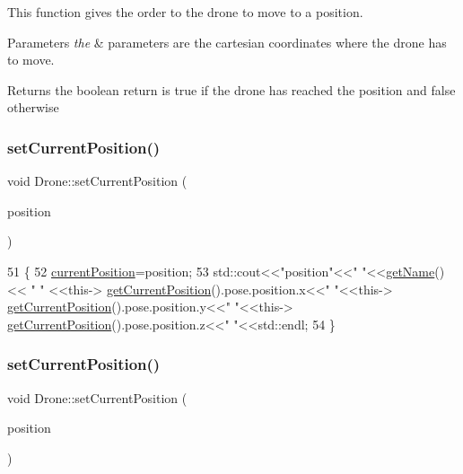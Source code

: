 This function gives the order to the drone to move to a position. 
\begin{DoxyParams}{Parameters}
{\em the} & parameters are the cartesian coordinates where the drone has to move. \\
\hline
\end{DoxyParams}
\begin{DoxyReturn}{Returns}
the boolean return is true if the drone has reached the position and false otherwise 
\end{DoxyReturn}
\mbox{\label{classDrone_a16ee9c16220886633f98e591c9e3dac5}} 
\subsubsection{\texorpdfstring{set\+Current\+Position()}{setCurrentPosition()}\hspace{0.1cm}{\footnotesize\ttfamily [1/2]}}
{\footnotesize\ttfamily void Drone\+::set\+Current\+Position (\begin{DoxyParamCaption}\item[{const geometry\+\_\+msgs\+::\+Pose\+Stamped}]{position }\end{DoxyParamCaption})}


\begin{DoxyCode}
51 \{
52         \hyperlink{classDrone_a190e4f63bb9a0e5b4f822fc87f2185f9}{currentPosition}=position;
53     std::cout<<\textcolor{stringliteral}{"position"}<<\textcolor{stringliteral}{"  "}<<\hyperlink{classDrone_a1fcaf0892001bf12b99c838e64878d9e}{getName}()<< \textcolor{stringliteral}{"  "} <<this->
      \hyperlink{classDrone_a0113e8f3a3f438113dca0d77c065276b}{getCurrentPosition}().pose.position.x<<\textcolor{stringliteral}{"  "}<<this->
      \hyperlink{classDrone_a0113e8f3a3f438113dca0d77c065276b}{getCurrentPosition}().pose.position.y<<\textcolor{stringliteral}{"  "}<<this->
      \hyperlink{classDrone_a0113e8f3a3f438113dca0d77c065276b}{getCurrentPosition}().pose.position.z<<\textcolor{stringliteral}{"  "}<<std::endl;
54 \}
\end{DoxyCode}
\mbox{\label{classDrone_a16ee9c16220886633f98e591c9e3dac5}} 
\subsubsection{\texorpdfstring{set\+Current\+Position()}{setCurrentPosition()}\hspace{0.1cm}{\footnotesize\ttfamily [2/2]}}
{\footnotesize\ttfamily void Drone\+::set\+Current\+Position (\begin{DoxyParamCaption}\item[{const geometry\+\_\+msgs\+::\+Pose\+Stamped}]{position }\end{DoxyParamCaption})}

